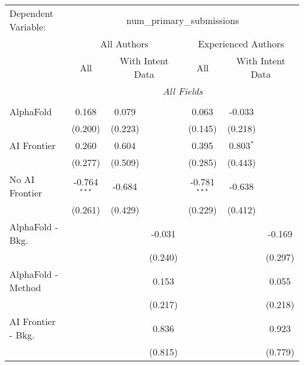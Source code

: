 \begingroup
\centering
\begin{tabular}{lcccccc}
   \tabularnewline \midrule \midrule
   Dependent Variable: & \multicolumn{6}{c}{num\_primary\_submissions}\\
 & \multicolumn{3}{c}{All Authors} & \multicolumn{3}{c}{Experienced Authors} \\
\cmidrule(lr){2-4} \cmidrule(lr){5-7}
 & \multicolumn{1}{c}{All} & \multicolumn{2}{c}{With Intent Data} & \multicolumn{1}{c}{All} & \multicolumn{2}{c}{With Intent Data} \\
\cmidrule(lr){2-2} \cmidrule(lr){3-4} \cmidrule(lr){5-5} \cmidrule(lr){6-7}
 & \multicolumn{6}{c}{\textit{All Fields}} \\ \\
   AlphaFold               & 0.168          & 0.079   &                & 0.063          & -0.033      &   \\   
                           & (0.200)        & (0.223) &                & (0.145)        & (0.218)     &   \\   
   AI Frontier             & 0.260          & 0.604   &                & 0.395          & 0.803$^{*}$ &   \\   
                           & (0.277)        & (0.509) &                & (0.285)        & (0.443)     &   \\   
   No AI Frontier          & -0.764$^{***}$ & -0.684  &                & -0.781$^{***}$ & -0.638      &   \\   
                           & (0.261)        & (0.429) &                & (0.229)        & (0.412)     &   \\   
   AlphaFold - Bkg.        &                &         & -0.031         &                &             & -0.169\\   
                           &                &         & (0.240)        &                &             & (0.297)\\   
   AlphaFold - Method      &                &         & 0.153          &                &             & 0.055\\   
                           &                &         & (0.217)        &                &             & (0.218)\\   
   AI Frontier - Bkg.      &                &         & 0.836          &                &             & 0.923\\   
                           &                &         & (0.815)        &                &             & (0.779)\\   

\end{tabular}
